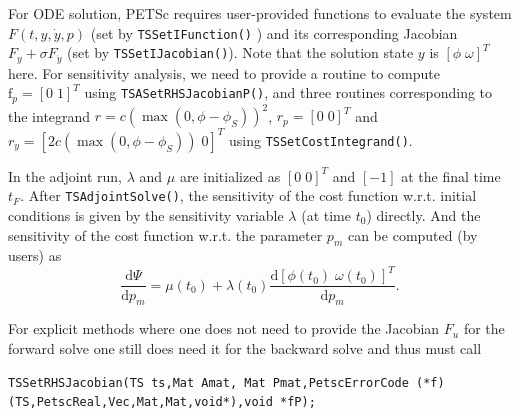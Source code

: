 For ODE solution, PETSc requires user-provided functions to evaluate the system $F(t,y,\dot{y},p)$ (set by \lstinline{TSSetIFunction()} )
and its corresponding Jacobian $F_y + \sigma F_{\dot y}$ (set by \lstinline{TSSetIJacobian()}).
Note that the solution state $y$ is $[ \phi \;  \omega ]^T$ here.
For sensitivity analysis, we need to provide a routine to compute $\mathrm{f}_p=[0 \; 1]^T$ using \lstinline{TSASetRHSJacobianP()},
and three routines corresponding to the integrand $r=c \left( \max(0, \phi - \phi_S ) \right)^2$, $r_p = [0 \; 0]^T$ and $r_y= [ 2 c \left( \max(0, \phi - \phi_S ) \right) \; 0]^T$ using \lstinline{TSSetCostIntegrand()}.

In the adjoint run, $\lambda$ and $\mu$ are initialized as $[ 0 \;  0 ]^T$ and $[-1]$ at the final time $t_F$.
After \lstinline{TSAdjointSolve()}, the sensitivity of the cost function w.r.t. initial conditions is given by the sensitivity variable $\lambda$ (at time $t_0$) directly.
And the sensitivity of the cost function w.r.t. the parameter $p_m$ can be computed (by users) as
%
\[
\frac{\mathrm{d} \Psi}{\mathrm{d} p_m} = \mu(t_0) + \lambda(t_0)  \frac{\mathrm{d} \left[ \phi(t_0) \; \omega(t_0) \right]^T}{\mathrm{d} p_m}  .
\]

For explicit methods where one does not need to provide the
Jacobian $F_u$ for the forward solve one still does need it for the
backward solve and thus must call
\begin{lstlisting}
TSSetRHSJacobian(TS ts,Mat Amat, Mat Pmat,PetscErrorCode (*f)(TS,PetscReal,Vec,Mat,Mat,void*),void *fP);
\end{lstlisting}

